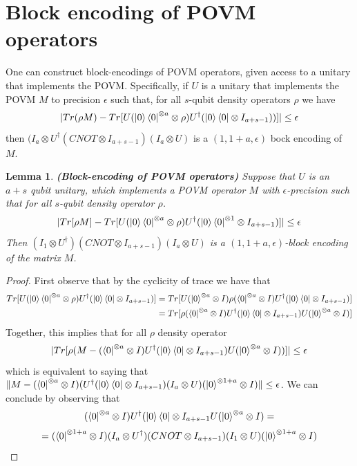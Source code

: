 \documentclass[12pt, oneside]{book}
\newtheorem{lemma}[theorem]{Lemma}
\theoremstyle{definition}
\theoremstyle{definition}
\theoremstyle{remark}
\begin{document}
\section{Block encoding of POVM operators}
One can construct block-encodings of POVM operators, given access to a unitary that implements the POVM. Specifically, if $U$ is a unitary that implements the POVM $M$ to precision $\epsilon$ such that, for all $s$-qubit density operators $\rho$ we have
\[
|Tr(\rho M)-Tr[U(\ket{0}\bra{0}^{\otimes a}\otimes \rho)U^{\dagger}(\ket{0}\bra{0}\otimes I_{a+s-1}))]|\leq \epsilon
\]
then $(I_a\otimes U^{\dagger}(CNOT\otimes I_{a+s-1})(I_a\otimes U)$ is a $(1,1+a,\epsilon)$ bock encoding of $M$.
\begin{lemma}
    \textbf{(Block-encoding of POVM operators)} Suppose that $U$ is an $a+s$ qubit unitary, which implements a POVM operator $M$ with $\epsilon$-precision such that for all $s$-qubit density operator $\rho$.
    \[
    |Tr[\rho M]-Tr[U(\ket{0}\bra{0}^{\otimes a}\otimes \rho)U^{\dagger}(\ket{0}\bra{0}^{\otimes 1}\otimes I_{a+s-1})]|\leq \epsilon
    \]
    Then $(I_1\otimes U^{\dagger})(CNOT\otimes I_{a+s-1})(I_a\otimes U)$ is a $(1,1+a,\epsilon)$-block encoding of the matrix $M$.
\end{lemma}
\begin{proof}
First observe that by the cyclicity of trace we have that
\begin{align*}
    Tr[U(\ket{0}\bra{0}^{\otimes a}\otimes \rho)U^{\dagger}(\ket{0}\bra{0}\otimes I_{a+s-1})] &=Tr[U(\ket{0}^{\otimes a}\otimes I)\rho(\bra{0}^{\otimes a}\otimes I)U^{\dagger}(\ket{0}\bra{0}\otimes I_{a+s-1})]\\
    &=Tr[\rho(\bra{0}^{\otimes a}\otimes I)U^{\dagger}(\ket{0}\bra{0}\otimes I_{a+s-1})U(\ket{0}^{\otimes a}\otimes I)]
\end{align*}
Together, this implies that for all $\rho$ density operator
\[
|Tr[\rho(M-(\bra{0}^{\otimes a}\otimes I)U^{\dagger}(\ket{0}\bra{0}\otimes I_{a+s-1})U(\ket{0}^{\otimes a}\otimes I))]|\leq \epsilon
\]
which is equivalent to saying that $\|M-(\bra{0}^{\otimes a}\otimes I)(U^{\dagger}(\ket{0}\bra{0}\otimes I_{a+s-1})(I_a\otimes U)(\ket{0}^{\otimes 1+a}\otimes I)\|\leq \epsilon$. We can conclude by observing that
\begin{align*}
    (\bra{0}^{\otimes a}\otimes I)U^{\dagger}(\ket{0}\bra{0}\otimes I_{a+s-1}U(\ket{0}^{\otimes a}\otimes I)=
\end{align*}
\[
=(\bra{0}^{\otimes 1+a}\otimes I)(I_a\otimes U^{\dagger})(CNOT\otimes I_{a+s-1})(I_1\otimes U)(\ket{0}^{\otimes 1+a}\otimes I)
\]
\end{proof}
\end{document}
